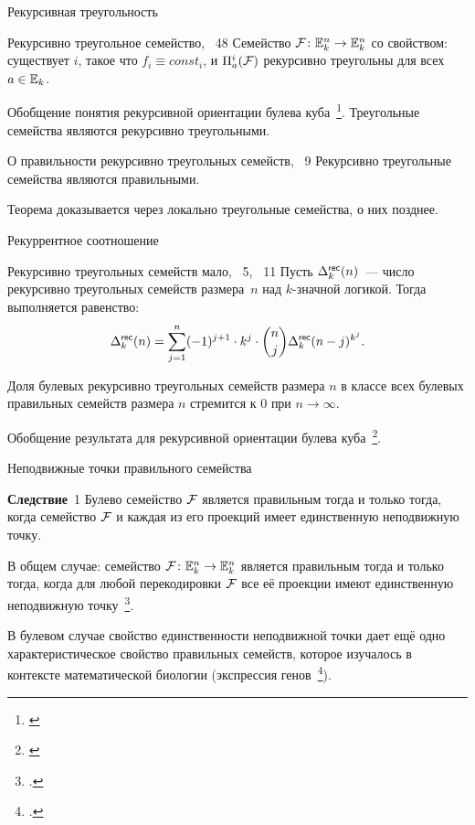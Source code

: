 \begin{frame}{Рекурсивная треугольность}
    \begin{myexample}{Рекурсивно треугольное семейство, ~48}
        Семейство $\mathcal{F} \colon \mathbb{E}_k^n \to \mathbb{E}_k^n$ со свойством: существует $i$, такое что $f_i \equiv const_i$, и $\Pi_a^i(\mathcal{F})$ рекурсивно треугольны для всех $a \in \mathbb{E}_k$.
    \end{myexample}
    Обобщение понятия рекурсивной ориентации булева куба~\footnote{\cite[A141770]{oeis}}.
    \pause
    Треугольные семейства являются рекурсивно треугольными.
    \pause
    \begin{mytheorem}{О правильности рекурсивно треугольных семейств, \lem~9}
        Рекурсивно треугольные семейства являются правильными.
    \end{mytheorem}
    \pause 
    Теорема доказывается через локально треугольные семейства, о них позднее.
\end{frame}


\begin{frame}{Рекуррентное соотношение}
    \begin{mytheorem}{Рекурсивно треугольных семейств мало, \lem~5, \thm~11}
        Пусть $\Delta^{\mathsf{rec}}_k(n)$~--- число рекурсивно треугольных семейств размера~$n$ над $k$-значной логикой.
        Тогда выполняется равенство:
        \[
            \Delta^{\mathsf{rec}}_k(n) = \sum_{j=1}^{n} (-1)^{j+1} \cdot k^j \cdot {n \choose j} \Delta^{\mathsf{rec}}_k(n-j)^{k^j}.
        \]

        Доля булевых рекурсивно треугольных семейств размера $n$ в классе всех булевых правильных семейств размера $n$ стремится к 0 при $n \to \infty$.
    \end{mytheorem}
    Обобщение результата для рекурсивной ориентации булева куба~\footnote{\cite[A141770]{oeis}}.
\end{frame}


\begin{frame}{Неподвижные точки правильного семейства}
    \begin{mytheorem}{\textbf{Следствие}~1}
        Булево семейство $\mathcal{F}$ является правильным тогда и только тогда, когда семейство $\mathcal{F}$ и каждая из его проекций имеет единственную неподвижную точку.
    \end{mytheorem}
    \pause 

    В общем случае: семейство $\mathcal{F} \colon \mathbb{E}_k^n \to \mathbb{E}_k^n$ является правильным тогда и только тогда, когда для любой перекодировки $\mathcal{F}$ все её проекции имеют единственную неподвижную точку~\footcite{galatenko21criterion}.

    \pause 
    В булевом случае свойство единственности неподвижной точки дает ещё одно характеристическое свойство правильных семейств, которое изучалось в контексте математической биологии (экспрессия генов~\footcite{thomas1991regulatory, richard2015fixed, ruet2015asynchronous, ruet2016local}).
\end{frame}


